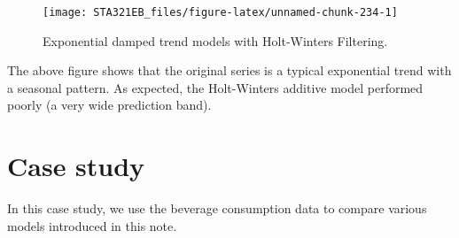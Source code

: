 \documentclass[
]{book}
\begin{document}
\begin{figure}

{\centering \texttt{[image: STA321EB\_files/figure-latex/unnamed-chunk-234-1]} 

}

\caption{Exponential damped trend models with Holt-Winters Filtering.}\label{fig:unnamed-chunk-234}
\end{figure}

The above figure shows that the original series is a typical exponential trend with a seasonal pattern. As expected, the Holt-Winters additive model performed poorly (a very wide prediction band).

\hypertarget{case-study-3}{%
\section{Case study}\label{case-study-3}}

In this case study, we use the beverage consumption data to compare various models introduced in this note.
\end{document}
